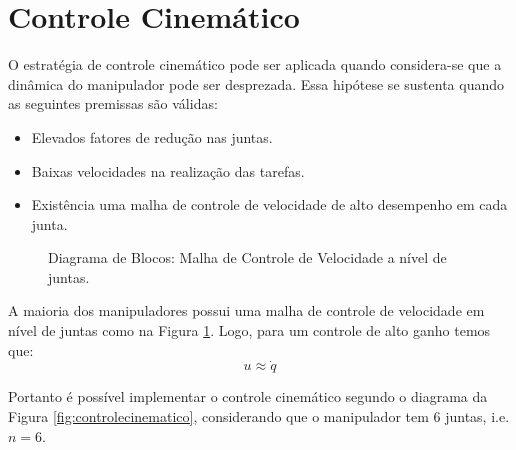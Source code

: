 \section{Controle Cinemático} \label{sec:controle_cinematico}
O estratégia de controle cinemático pode ser aplicada quando considera-se que a dinâmica do manipulador pode ser desprezada. Essa hipótese se sustenta quando as seguintes premissas são válidas:
\begin{itemize}
\item Elevados fatores de redução nas juntas.
\item Baixas velocidades na realização das tarefas.
\item Existência uma malha de controle de velocidade de alto desempenho em cada junta.
\end{itemize}

\begin{figure}[h!]
\centering
{}
\caption{Diagrama de Blocos: Malha de Controle de Velocidade a nível de juntas.}
\label{fig:controlejuntas}
\end{figure}

A maioria dos manipuladores possui uma malha de controle de velocidade em nível de juntas como na Figura \ref{fig:controlejuntas}. Logo, para um controle de alto ganho temos que:
\[ {u} \approx \dot{{q}}\]



Portanto é possível implementar o controle cinemático segundo o diagrama da Figura \ref{fig:controlecinematico}, considerando que o manipulador tem 6 juntas, i.e. $n=6$.

